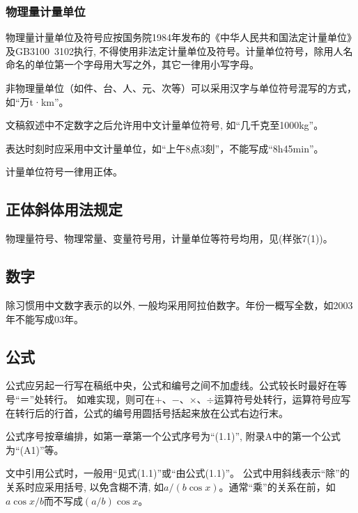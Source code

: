     \subsubsection{物理量计量单位}
        物理量计量单位及符号应按国务院1984年发布的《中华人民共和国法定计量单位》及GB3100~3102执行, 不得使用非法定计量单位及符号。计量单位符号，除用人名命名的单位第一个字母用大写之外，其它一律用小写字母。

        非物理量单位（如件、台、人、元、次等）可以采用汉字与单位符号混写的方式，如“万t·km”。

        文稿叙述中不定数字之后允许用中文计量单位符号, 如“几千克至1000kg”。

        表达时刻时应采用中文计量单位，如“上午8点3刻”，不能写成“8h45min”。

        计量单位符号一律用正体。

    \subsection{正体斜体用法规定}
    物理量符号、物理常量、变量符号用{\bfseries{}}，计量单位等符号均用{\bfseries{}}，见(样张7(1))。
    \subsection{数字}
    除习惯用中文数字表示的以外, 一般均采用阿拉伯数字。年份一概写全数，如2003年不能写成03年。
    \subsection{公式}
    公式应另起一行写在稿纸中央，公式和编号之间不加虚线。公式较长时最好在等号“＝”处转行。
    如难实现，则可在$+$、$-$、$\times$、$\div$运算符号处转行，运算符号应写在转行后的行首，公式的编号用圆括号括起来放在公式右边行末。

    公式序号按章编排，如第一章第一个公式序号为“(1.1)”, 附录A中的第一个公式为“(A1)”等。

    文中引用公式时，一般用“见式(1.1)”或“由公式(1.1)”。
    公式中用斜线表示“除”的关系时应采用括号, 以免含糊不清, 如$a/(b\cos x)$。通常“乘”的关系在前，如$a\cos x/b$而不写成$(a/b)\cos x$。
